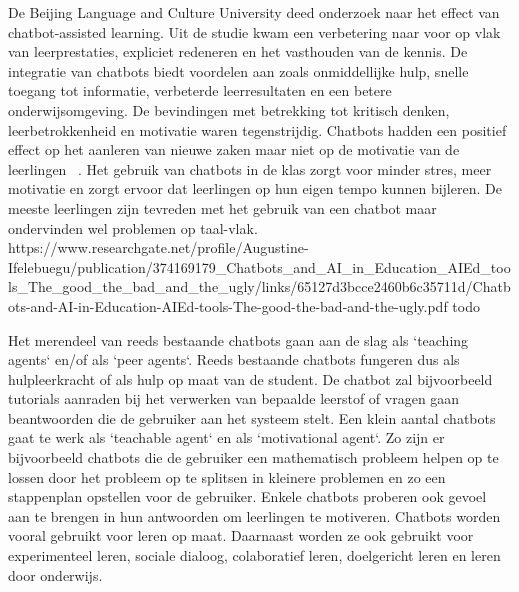 De Beijing Language and Culture University deed onderzoek naar het effect van chatbot-assisted learning. 
Uit de studie kwam een verbetering naar voor op vlak van leerprestaties, expliciet redeneren en het vasthouden van de kennis. 
De integratie van chatbots biedt voordelen aan zoals onmiddellijke hulp, snelle toegang tot informatie, verbeterde leerresultaten en een betere onderwijsomgeving. 
De bevindingen met betrekking tot kritisch denken, leerbetrokkenheid en motivatie waren tegenstrijdig. 
Chatbots hadden een positief effect op het aanleren van nieuwe zaken maar niet op de motivatie van de leerlingen ~\autocite{Deng2023}. 
Het gebruik van chatbots in de klas zorgt voor minder stres, meer motivatie en zorgt ervoor dat leerlingen op hun eigen tempo kunnen bijleren. 
De meeste leerlingen zijn tevreden met het gebruik van een chatbot maar ondervinden wel problemen op taal-vlak. ~\autocite{AitBaha2023}
https://www.researchgate.net/profile/Augustine-Ifelebuegu/publication/374169179_Chatbots_and_AI_in_Education_AIEd_tools_The_good_the_bad_and_the_ugly/links/65127d3bcce2460b6c35711d/Chatbots-and-AI-in-Education-AIEd-tools-The-good-the-bad-and-the-ugly.pdf todo

Het merendeel van reeds bestaande chatbots gaan aan de slag als `teaching agents` en/of als `peer agents`. Reeds bestaande chatbots fungeren dus als hulpleerkracht of als hulp op maat van de student. De chatbot zal bijvoorbeeld tutorials aanraden bij het verwerken van bepaalde leerstof of vragen gaan beantwoorden die de gebruiker aan het systeem stelt. Een klein aantal chatbots gaat te werk als `teachable agent` en als `motivational agent`. Zo zijn er bijvoorbeeld chatbots die de gebruiker een mathematisch probleem helpen op te lossen door het probleem op te splitsen in kleinere problemen en zo een stappenplan opstellen voor de gebruiker. Enkele chatbots proberen ook gevoel aan te brengen in hun antwoorden om leerlingen te motiveren. 
Chatbots worden vooral gebruikt voor leren op maat. Daarnaast worden ze ook gebruikt voor experimenteel leren, sociale dialoog, colaboratief leren, doelgericht leren en leren door onderwijs. 

